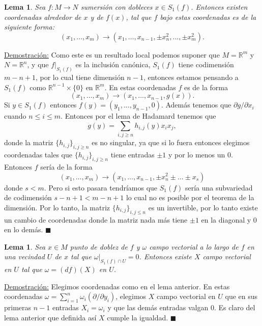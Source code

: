 \documentclass{report}
\newtheorem{lem}[theorem]{Lema}
\theoremstyle{definition}
\begin{document}
\begin{lem}
Sea $f:M \to N$ sumersi\'on con dobleces $x \in S_1(f)$. Entonces existen coordenadas alrededor de $x$ y de $f(x)$, tal que $f$ bajo estas coordenadas es de la siguiente forma:
$$(x_1, \dots , x_m) \to (x_1 , \dots , x_{n-1} , \pm x_n^2 , \dots , \pm x_m^2).$$
\end{lem}

\underline{Demostraci\'on:} Como este es un resultado local podemos suponer que $M = \mathbb{R}^m$ y $N= \mathbb{R}^n$, y que $f \vert_{S_1 (f)}$ es la inclusi\'on can\'onica, $S_1 (f)$ tiene codimensi\'on $m - n +1$, por lo cual tiene dimensi\'on $n-1$, entonces estamos pensando a $S_1 (f)$ como $\mathbb{R}^{n-1} \times \{ 0 \}$ en $\mathbb{R}^m$. En estas coordenadas $f$ es de la forma $$(x_1 , \dots , x_m) \to (x_1 , \dots , x_{n-1} , g(x)).$$ Si $y \in S_1 (f)$ entonces $f(y) = (y_1 , \dots , y_{n-1} , 0)$. Adem\'as tenemos que $\partial g / \partial x_i $ cuando $n \leq i \leq m$. Entonces por el lema de Hadamard tenemos que 
$$g(y) = \sum\limits_{i, j \geq n} h_{i,j}(y) x_i x_j,$$
donde la matriz $ \{ h_{i,j} \}_{i, j \geq n}$ es no singular, ya que si lo fuera entonces elegimos coordenadas tales que $\{h_{i,j} \}_{i , j \geq n}$ tiene entradas $ \pm 1$ y por lo menos un $0$. Entonces $f$ ser\'ia de la forma $$(x_1 , \dots , x_m) \to (x_1 , \dots , x_{n-1} , \pm x_n^2 \pm \dots \pm x_s )$$ donde $s < m$. Pero si esto pasara tendr\'iamos que $S_1(f)$ ser\'ia una subvariedad de codimensi\'on $s - n + 1 < m - n +1$ lo cual no es posible por el teorema de la dimensi\'on. Por lo tanto, la matriz $\{ h_{i,j} \}_{i, j \leq n}$ es un invertible, por lo tanto existe un cambio de coordenadas donde la matriz nada m\'as tiene $\pm 1$ en la diagonal y $0$ en lo dem\'as. $\blacksquare$

\begin{lem}
Sea $x \in M$ punto de doblez de $f$ y $\omega$ campo vectorial a lo largo de $f$ en una vecindad $U$ de $x$ tal que $\omega \vert_{S_1 (f) \cap U} = 0$. Entonces existe $X$ campo vectorial en $U$ tal que $\omega = (df)(X)$ en $U$.
\end{lem}

\underline{Demostraci\'on:} Elegimos coordenadas como en el lema anterior. En estas coordenadas $\omega = \sum\limits_{i=1}^n \omega_i (\partial / \partial y_i )$, elegimos $X$ campo vectorial en $U$ que en sus primeras $n-1$ entradas $X_i = \omega_i$ y que las dem\'as entradas valgan $0$. Es claro del lema anterior que definida as\'i $X$ cumple la igualdad. $\blacksquare$
\end{document}
